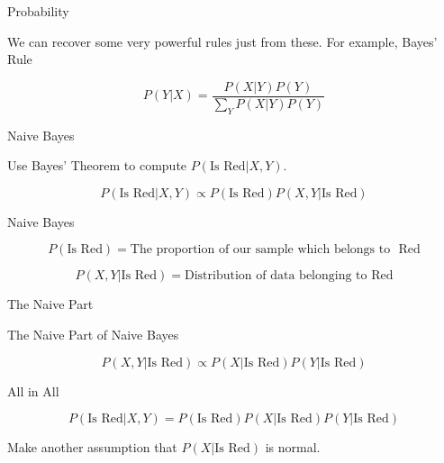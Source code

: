 \documentclass[12pt,ignorenonframetext,]{beamer}
\begin{document}
\begin{frame}{Probability}
\protect\hypertarget{probability-2}{}

We can recover some very powerful rules just from these. For example,
Bayes' Rule

\[P(Y|X) = \dfrac{P(X|Y)P(Y)}{\displaystyle{\sum_Y} P(X|Y)P(Y) }\]

\end{frame}

\begin{frame}{Naive Bayes}
\protect\hypertarget{naive-bayes}{}

Use Bayes' Theorem to compute \(P(\mbox{Is Red}|X,Y)\).

\[P(\mbox{Is Red}|X,Y) \propto P(\mbox{Is Red})P(X,Y|\mbox{Is Red})\]

\end{frame}

\begin{frame}{Naive Bayes}
\protect\hypertarget{naive-bayes-1}{}

\[P(\mbox{Is Red}) = \mbox{The proportion of our sample which belongs to } \mbox{ Red} \]

\[P(X,Y|\mbox{Is Red}) = \mbox{Distribution of data belonging to } \mbox{Red}\]

\end{frame}

\begin{frame}{The Naive Part}
\protect\hypertarget{the-naive-part}{}

The Naive Part of Naive Bayes

\[P(X,Y|\mbox{Is Red}) \propto P(X \vert \mbox{Is Red})P(Y\vert \mbox{Is Red})\]

\end{frame}

\begin{frame}{All in All}
\protect\hypertarget{all-in-all}{}

\[P(\mbox{Is Red}|X,Y) = P(\mbox{Is Red})P(X \vert \mbox{Is Red})P(Y\vert\mbox{Is Red})\]

Make another assumption that \(P(X \vert \mbox{Is Red})\) is normal.

\end{frame}
\end{document}
